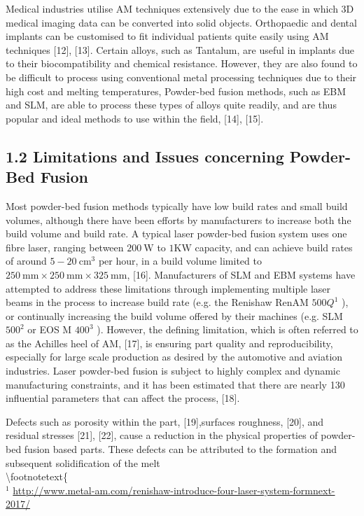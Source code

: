 \documentclass[10pt]{article}
\begin{document}
Medical industries utilise AM techniques extensively due to the ease in which 3D medical imaging data can be converted into solid objects. Orthopaedic and dental implants can be customised to fit individual patients quite easily using AM techniques [12], [13]. Certain alloys, such as Tantalum, are useful in implants due to their biocompatibility and chemical resistance. However, they are also found to be difficult to process using conventional metal processing techniques due to their high cost and melting temperatures, Powder-bed fusion methods, such as EBM and SLM, are able to process these types of alloys quite readily, and are thus popular and ideal methods to use within the field, [14], [15].

\subsection*{1.2 Limitations and Issues concerning Powder-Bed Fusion}
Most powder-bed fusion methods typically have low build rates and small build volumes, although there have been efforts by manufacturers to increase both the build volume and build rate. A typical laser powder-bed fusion system uses one fibre laser, ranging between $200 \mathrm{~W}$ to $1 \mathrm{KW}$ capacity, and can achieve build rates of around $5-20 \mathrm{~cm}^{3}$ per hour, in a build volume limited to $250 \mathrm{~mm} \times 250 \mathrm{~mm} \times 325 \mathrm{~mm}$, [16]. Manufacturers of SLM and EBM systems have attempted to address these limitations through implementing multiple laser beams in the process to increase build rate (e.g. the Renishaw RenAM $500 Q^{1}$ ), or continually increasing the build volume offered by their machines (e.g. SLM $500^{2}$ or EOS M $400^{3}$ ). However, the defining limitation, which is often referred to as the Achilles heel of AM, [17], is ensuring part quality and reproducibility, especially for large scale production as desired by the automotive and aviation industries. Laser powder-bed fusion is subject to highly complex and dynamic manufacturing constraints, and it has been estimated that there are nearly 130 influential parameters that can affect the process, [18].

Defects such as porosity within the part, [19],surfaces roughness, [20], and residual stresses [21], [22], cause a reduction in the physical properties of powder-bed fusion based parts. These defects can be attributed to the formation and subsequent solidification of the melt\\
\textbackslash footnotetext\{\\
${ }^{1}$ \href{http://www.metal-am.com/renishaw-introduce-four-laser-system-formnext-2017/}{http://www.metal-am.com/renishaw-introduce-four-laser-system-formnext-2017/}
\end{document}
